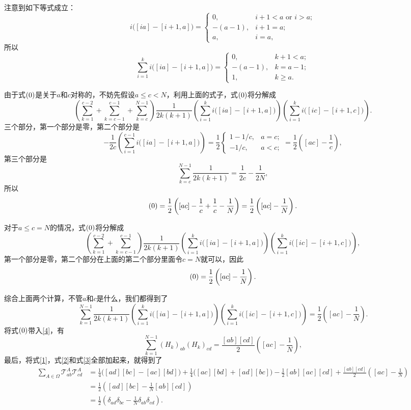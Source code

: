 \documentclass[11pt]{article}
\theoremstyle{definition}
\theoremstyle{plain}
\begin{document}
注意到如下等式成立：
\[
	i\bigl([ia]-[i+1,a]\bigr)=
	\begin{cases}
	0,& i+1<a \text{ or } i>a;\\
	-(a-1),&i+1=a;\\
	a,&i=a,
	\end{cases}
\]
所以
\[
	\sum_{i=1}^ki\bigl([ia]-[i+1,a]\bigr)=
	\begin{cases}
	0,& k+1<a;\\
	-(a-1),&k=a-1;\\
	1,&k\geq a.
	\end{cases}
\]

由于式$(\theequation)$是关于$a$和$c$对称的，不妨先假设$a\leq c<N$，利用上面的式子，式$(\theequation)$将分解成
\[
\left(\sum_{k=1}^{c-2}+\sum_{k=c-1}^{c-1}+\sum_{k=c}^{N-1}\right)\frac{1}{2k(k+1)}\left(\sum_{i=1}^k i\bigl([ia]-[i+1,a]\bigr)\right)\left(\sum_{i=1}^k i\bigl([ic]-[i+1,c]\bigr)\right).
\]
三个部分，第一个部分是零，第二个部分是
\[
	-\frac{1}{2c}\left(\sum_{i=1}^{c-1} i\bigl([ia]-[i+1,a]\bigr)\right)=\frac{1}{2}
	\begin{cases}
	1-1/c,& a=c;\\
	-1/c,&a<c;
	\end{cases}=\frac{1}{2}\left([ac]-\frac{1}{c}\right),
\]
第三个部分是
\[
	\sum_{k=c}^{N-1}\frac{1}{2k(k+1)}=\frac{1}{2c}-\frac{1}{2N},
\]
所以
\[
	(\theequation)=\frac{1}{2}\left([ac]-\frac{1}{c}+\frac{1}{c}-\frac{1}{N}\right)=\frac{1}{2}\left([ac]-\frac{1}{N}\right).
\]

对于$a\leq c=N$的情况，式$(\theequation)$将分解成
\[
\left(\sum_{k=1}^{c-2}+\sum_{k=c-1}^{c-1}\right)\frac{1}{2k(k+1)}\left(\sum_{i=1}^k i\bigl([ia]-[i+1,a]\bigr)\right)\left(\sum_{i=1}^k i\bigl([ic]-[i+1,c]\bigr)\right),
\]
第一个部分是零，第二个部分在上面的第二个部分里面令$c=N$就可以，因此
\[
	(\theequation)=\frac{1}{2}\left([ac]-\frac{1}{N}\right).
\]

综合上面两个计算，不管$a$和$c$是什么，我们都得到了
\begin{equation}
	\sum_{k=1}^{N-1}\frac{1}{2k(k+1)}\left(\sum_{i=1}^k i\bigl([ia]-[i+1,a]\bigr)\right)\left(\sum_{i=1}^k i\bigl([ic]-[i+1,c]\bigr)\right)=\frac{1}{2}\left([ac]-\frac{1}{N}\right).
\end{equation}
将式$(\theequation)$带入\eqref{4}，有
\begin{equation}
\label{3}
\sum_{k=1}^{N-1}(H_k)_{ab}(H_k)_{cd}=\frac{[ab][cd]}{2}\left([ac]-\frac{1}{N}\right),
\end{equation}
最后，将式\eqref{1}，式\eqref{2}和式\eqref{3}全部加起来，就得到了
\[
\begin{split}
	\sum_{A\in \Omega}\mathcal{T}^A_{ab}\mathcal{T}^A_{cd}&=\frac{1}{4}\bigl([ad][bc]-[ac][bd]\bigr)+\frac{1}{4}\bigl([ac][bd]+[ad][bc]\bigr)-\frac{1}{2}[ab][ac][cd]+\frac{[ab][cd]}{2}\left([ac]-\frac{1}{N}\right)\\
	&=\frac{1}{2}\left([ad][bc]-\frac{1}{N}[ab][cd]\right)\\
	&=\frac{1}{2}\left(\delta_{ad}\delta_{bc}-\frac{1}{N}\delta_{ab}\delta_{cd}\right).
\end{split}
\]
\endproof
\end{document}
